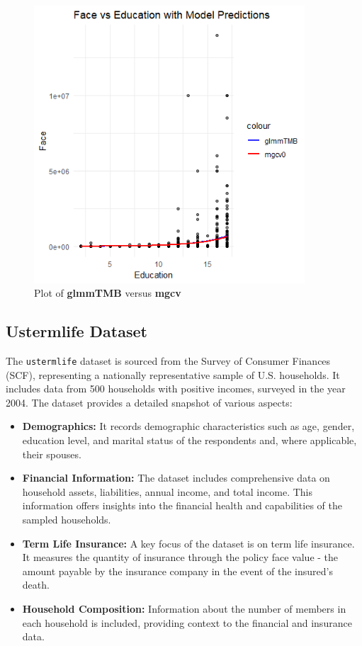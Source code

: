 \documentclass[12pt, twoside,hidelinks]{article}
\theoremstyle{definition}
\numberwithin{equation}{section}
\begin{document}
\newpage
\begin{figure}[ht!]
    \centering
    \includegraphics[width=0.9\textwidth]{visuals/InsuranceVisuals/FacevEducation.png}
    \caption{Plot of \textbf{glmmTMB} versus \textbf{mgcv}}
    \label{fig:FaceVseducation}
\end{figure}






\subsection{Ustermlife Dataset}
The \texttt{ustermlife} dataset is sourced from the Survey of Consumer Finances (SCF), representing a nationally representative sample of U.S. households. It includes data from 500 households with positive incomes, surveyed in the year 2004. The dataset provides a detailed snapshot of various aspects:

\begin{itemize}
    \item \textbf{Demographics:} It records demographic characteristics such as age, gender, education level, and marital status of the respondents and, where applicable, their spouses.
    \item \textbf{Financial Information:} The dataset includes comprehensive data on household assets, liabilities, annual income, and total income. This information offers insights into the financial health and capabilities of the sampled households.
    \item \textbf{Term Life Insurance:} A key focus of the dataset is on term life insurance. It measures the quantity of insurance through the policy face value - the amount payable by the insurance company in the event of the insured's death.
    \item \textbf{Household Composition:} Information about the number of members in each household is included, providing context to the financial and insurance data.
\end{itemize}
\end{document}
